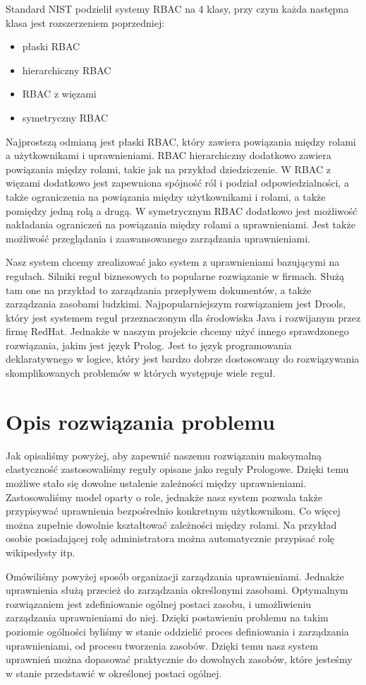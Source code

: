 \documentclass{classrep}
\begin{document}
Standard NIST podzielił systemy RBAC na 4 klasy, przy czym każda następna klasa jest rozszerzeniem poprzedniej:
\begin{itemize}
\item płaski RBAC
\item hierarchiczny RBAC
\item RBAC z więzami
\item symetryczny RBAC
\end{itemize}
Najprostszą odmianą jest płaski RBAC, który zawiera powiązania między rolami a użytkownikami i uprawnieniami. RBAC hierarchiczny dodatkowo zawiera powiązania między rolami,
takie jak na przykład dziedziczenie. W RBAC z więzami dodatkowo jest zapewniona spójność ról i podział odpowiedzialności, a także ograniczenia na powiązania między użytkownikami
i rolami, a także pomiędzy jedną rolą a drugą. W symetrycznym RBAC dodatkowo jest możliwość nakładania ograniczeń na powiązania między rolami a uprawnieniami. Jest także możliwość przeglądania
i zaawansowanego zarządzania uprawnieniami.

Nasz system chcemy zrealizować jako system z uprawnieniami bazującymi na regułach. Silniki reguł biznesowych to popularne rozwiązanie w firmach. Służą tam one na przykład to zarządzania
przepływem dokumentów, a także zarządzania zasobami ludzkimi. Najpopularniejszym rozwiązaniem jest Drools\cite{Drools}, który jest systemem reguł przeznaczonym dla środowiska Java i rozwijanym
przez firmę RedHat. Jednakże w naszym projekcie chcemy użyć innego sprawdzonego rozwiązania, jakim jest język Prolog\cite{Prolog}. Jest to język programowania deklaratywnego w logice,
który jest bardzo dobrze dostosowany do rozwiązywania skomplikowanych problemów w których występuje wiele reguł. 
\section{Opis rozwiązania problemu}
Jak opisaliśmy powyżej, aby zapewnić naszemu rozwiązaniu maksymalną elastyczność zastosowaliśmy reguły opisane jako reguły Prologowe. Dzięki temu możliwe stało się dowolne ustalenie zależności
między uprawnieniami. Zastosowaliśmy model oparty o role, jednakże nasz system pozwala także przypisywać uprawnienia bezpośrednio konkretnym użytkownikom. Co więcej można zupełnie
dowolnie kształtować zależności między rolami. Na przykład osobie posiadającej rolę administratora można automatycznie przypisać rolę wikipedysty itp.

Omówiliśmy powyżej sposób organizacji zarządzania uprawnieniami. Jednakże uprawnienia służą przecież do zarządzania określonymi zasobami. Optymalnym rozwiązaniem jest
zdefiniowanie ogólnej postaci zasobu, i umożliwieniu zarządzania uprawnieniami do niej. Dzięki postawieniu problemu na takim poziomie ogólności byliśmy w stanie oddzielić proces
definiowania i zarządzania uprawnieniami, od procesu tworzenia zasobów. Dzięki temu nasz system uprawnień można dopasować praktycznie do dowolnych zasobów, które jesteśmy w stanie
przedstawić w określonej postaci ogólnej. 
\end{document}
